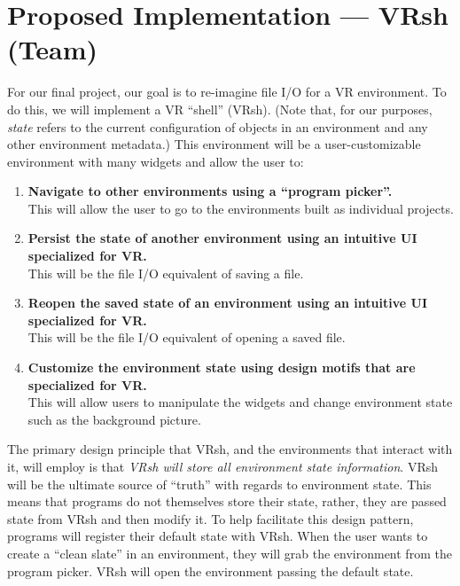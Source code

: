 \documentclass[titlepage,12pt]{article}
\begin{document}
\section{Proposed Implementation --- VRsh (Team)}
For our final project, our goal is to re-imagine file I/O for a VR environment.
To do this, we will implement a VR ``shell'' (VRsh). (Note that, for our
purposes, \textit{state} refers to the current configuration of objects in an
environment and any other environment metadata.) This environment will be a
user-customizable environment with many widgets and allow the user to:

\begin{enumerate}
    \item \textbf{Navigate to other environments using a ``program picker''.}\\
        This will allow the user to go to the environments built as individual
        projects.

    \item \textbf{Persist the state of another environment using an intuitive UI
        specialized for VR.} \\
        This will be the file I/O equivalent of saving a file.

    \item \textbf{Reopen the saved state of an environment using an intuitive UI
        specialized for VR.} \\
        This will be the file I/O equivalent of opening a saved file.

    \item \textbf{Customize the environment state using design motifs that are
        specialized for VR.} \\
        This will allow users to manipulate the widgets and change environment
        state such as the background picture.
\end{enumerate}

The primary design principle that VRsh, and the environments that interact with
it, will employ is that \textit{VRsh will store all environment state
information}. VRsh will be the ultimate source of ``truth'' with regards to
environment state. This means that programs do not themselves store their state,
rather, they are passed state from VRsh and then modify it. To help facilitate
this design pattern, programs will register their default state with VRsh.
When the user wants to create a ``clean slate'' in an environment, they will
grab the environment from the program picker. VRsh will open the environment
passing the default state.
\end{document}
